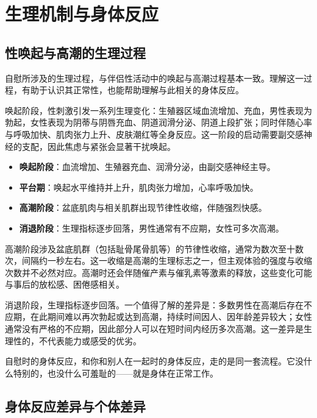 \documentclass[12pt,UTF8]{ctexbook}
\newcommand{\keyword}[1]{\textbf{#1}}
\begin{document}
\section{生理机制与身体反应}
\subsection{性唤起与高潮的生理过程}

自慰所涉及的生理过程，与伴侣性活动中的唤起与高潮过程基本一致。理解这一过程，有助于认识其正常性，也能帮助理解与此相关的身体反应。

唤起阶段，性刺激引发一系列生理变化：生殖器区域血流增加、充血，男性表现为勃起，女性表现为阴蒂与阴唇充血、阴道润滑分泌、阴道上段扩张；同时伴随心率与呼吸加快、肌肉张力上升、皮肤潮红等全身反应。这一阶段的启动需要副交感神经的支配，因此焦虑与紧张会显著干扰唤起。

\begin{itemize}
	\item \keyword{唤起阶段}：血流增加、生殖器充血、润滑分泌，由副交感神经主导。
	\item \keyword{平台期}：唤起水平维持并上升，肌肉张力增加，心率呼吸加快。
	\item \keyword{高潮阶段}：盆底肌肉与相关肌群出现节律性收缩，伴随强烈快感。
	\item \keyword{消退阶段}：生理指标逐步回落，男性通常有不应期，女性可多次高潮。
\end{itemize}

高潮阶段涉及盆底肌群（包括耻骨尾骨肌等）的节律性收缩，通常为数次至十数次，间隔约一秒左右。这一收缩是高潮的生理标志之一，但主观体验的强度与收缩次数并不必然对应。高潮时还会伴随催产素与催乳素等激素的释放，这些变化可能与事后的放松感、困倦感相关。

消退阶段，生理指标逐步回落。一个值得了解的差异是：多数男性在高潮后存在不应期，在此期间难以再次勃起或达到高潮，持续时间因人、因年龄差异较大；女性通常没有严格的不应期，因此部分人可以在短时间内经历多次高潮。这一差异是生理性的，不代表能力或感受的优劣。

\begin{tcolorbox}[colback=pink!5!white,colframe=red!50!black,title=贴心小叮咛]
	自慰时的身体反应，和你和别人在一起时的身体反应，走的是同一套流程。它没什么特别的，也没什么可羞耻的——就是身体在正常工作。
\end{tcolorbox}

\subsection{身体反应差异与个体差异}
\end{document}
